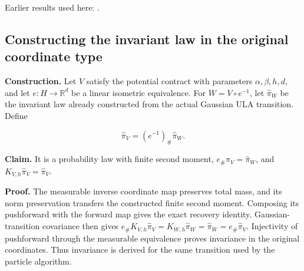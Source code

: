 \documentclass[11pt,a4paper]{report}
\begin{document}
Earlier results used here: \cite[Section~3.16]{LangevinLean2026IPLA}.
\subsection{\texorpdfstring{Constructing the invariant law in the original coordinate type}{Constructing the invariant law in the original coordinate type}}
\label{report-step-WassersteinMixing-IPLABridge-lean-1}


\textbf{Construction.} Let \(V\) satisfy the potential contract with parameters \(\alpha,\beta,h,d\), and let \(e:H\to\mathbb R^d\) be a linear isometric equivalence. For \(W=V\circ e^{-1}\), let \(\widehat\pi_W\) be the invariant law already constructed from the actual Gaussian ULA transition. Define

\[\widehat\pi_V=(e^{-1})_\#\widehat\pi_W.\]


\textbf{Claim.} It is a probability law with finite second moment, \(e_\#\widehat\pi_V=\widehat\pi_W\), and \(K_{V,h}\widehat\pi_V=\widehat\pi_V\).




\textbf{Proof.} The measurable inverse coordinate map preserves total mass, and its norm preservation transfers the constructed finite second moment. Composing its pushforward with the forward map gives the exact recovery identity. Gaussian-transition covariance then gives \(e_\#K_{V,h}\widehat\pi_V=K_{W,h}\widehat\pi_W=\widehat\pi_W=e_\#\widehat\pi_V\). Injectivity of pushforward through the measurable equivalence proves invariance in the original coordinates. Thus invariance is derived for the same transition used by the particle algorithm.
\end{document}
